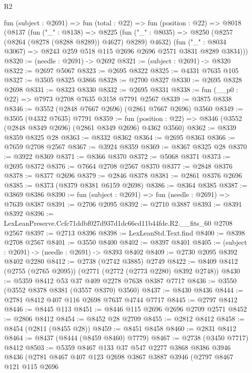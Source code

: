 \begin{lexlean}{R2}
\begin{coremodule}
  fun (subject : @2691) =>
  fun (total : @22) =>
  fun (position : @22) =>
  @8018
    (@8137
      (fun ("_" : @8138) =>
      @8225
        (fun ("_" : @8035) => @8250 (@8257 (@8264 (@8278 (@8288 @8289)) @4627) @8289) @4632)
        (fun ("_" : @8034 @3067) => @8243 @259 @518 @115 @2696 @2696 @2571 @3831 @8289 @3834)))
@8320 := (needle : @2691) -> @2692
@8321 := (subject : @2691) -> @8320
@8322 := @2697 @5067
@8323 := @2695 @8322
@8325 := @4331 @7635 @105
@8327 := @3505 @8325 @3866
@8328 := @2700 @8327
@8330 := @2695 @8328 @2698
@8331 := @8323 @8330
@8332 := @2695 @8331
@8338 := fun (__p0 : @22) => @7973 @2708 @7635 @3158 @7791 @2567
@8339 := @3875 @8338
@8346 := @3552 (@2848 @7667 @2696) (@2861 @7667 @2696) @3560
@8349 := @3505 (@4332 @7635) @7791
@8359 := fun (position : @22) => @8346 (@3552 (@2848 @8349 @2696) (@2861 @8349 @2696) @4362 @3560)
@8362 := @8339 @8359 @8325 @28
@8363 := @8332 @8362
@8364 := @2695 @8363
@8366 := @7659 @2708 @2567
@8367 := @3924 @8359
@8369 := @8367 @8325 @28
@8370 := @3922 @8369
@8371 := @8366 @8370
@8372 := @5068 @8371
@8373 := @2695 @8372
@8376 := @7664 @2708 @2567 @8370
@8377 := @2848 @8376
@8378 := @8377 @2696
@8379 := @2846 @8378
@8381 := @2861 @8376 @2696
@8385 := @8373 (@8379 @8381 @6159 @2698)
@8386 := @8364 @8385
@8387 := @3869 @8386
@8390 := fun (subject : @2691) => fun (needle : @2691) => @7639 @8387
@8391 := @2706 @2095
@8392 := @2710 @3887
@8393 := @8391 @8392
@8396 := LexLeanPreserve.Ccfc71ddbf027d937d1dc66cd11b44fde.R2.__fits_60 @2708 @2567
@8397 := @2713 @8396
@8398 := LexLeanStd.Text.find
@8400 := @8398 @2708 @2567
@8401 := @3550 @8400
@8402 := @8397 @8401
@8405 := (subject : @2691) -> (needle : @2691) -> @8393 @8402
@8409 := @2730 @2095 @8392 @8402 @2280
@8412 := @2738 (@2742 @3885) @2749
@8422 := @8409 @8412 (@2755 (@2765 @2095)) (@2771 (@2772 (@2773 @2280) @8392 @2748))
@8430 := @5359 @8412 @53 @37 @409 @2278 @7638 @8387 @7717
@8436 := @3550 (@3552 @8378 @8381 (@3557 @8370) @3560)
@8437 := @8430 @8436
@8444 := @2781 @8412 @407 @116 @2698 @7637 @4744 @7717
@8445 := @2797 @8412
@8446 := @8445 @113
@8451 := @8446 @115 @2696 @2696 @2709 @2571
@8452 := @2806 @8412
@8454 := @8452 @28 @2709
@8455 := @2812 @8412
@8458 := @8454 (@2811 (@8455 @28))
@8459 := @8451 @8458
@8460 := @2831 @8412
@8464 := @8437 (@8444 (@8459 @8460) @7779)
@8467 := @2738 (@3450 @7717) @8412
@8503 := @5359
    @8467
    @133
    @37
    @547
    @2277
    @3868
    @8386
    @3946
    @8436
    (@2781
      @8467
      @407
      @123
      @2698
      @3867
      @3887
      @3946
      (@2797
        @8467
        @121
        @115
        @2696

\end{coremodule}
\end{lexlean}
